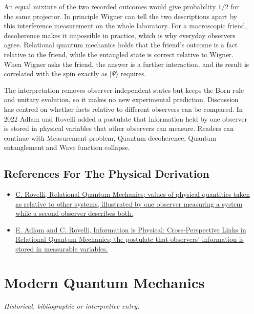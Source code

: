 \documentclass[11pt,oneside]{book}
\newcommand{\ket}[1]{\lvert #1\rangle}
\begin{document}
An equal mixture of the two recorded outcomes would give probability \(1/2\) for the same projector. In principle Wigner can tell the two descriptions apart by this interference measurement on the whole laboratory. For a macroscopic friend, decoherence makes it impossible in practice, which is why everyday observers agree. Relational quantum mechanics holds that the friend's outcome is a fact relative to the friend, while the entangled state is correct relative to Wigner. When Wigner asks the friend, the answer is a further interaction, and its result is correlated with the spin exactly as \(\ket{\Psi}\) requires.

The interpretation removes observer-independent states but keeps the Born rule and unitary evolution, so it makes no new experimental prediction. Discussion has centred on whether facts relative to different observers can be compared. In 2022 Adlam and Rovelli added a postulate that information held by one observer is stored in physical variables that other observers can measure. Readers can continue with Measurement problem, Quantum decoherence, Quantum entanglement and Wave function collapse.

\subsection*{References For The Physical Derivation}
\begin{itemize}
\item \href{https://arxiv.org/abs/quant-ph/9609002}{C. Rovelli, Relational Quantum Mechanics; values of physical quantities taken as relative to other systems, illustrated by one observer measuring a system while a second observer describes both.}
\item \href{https://arxiv.org/abs/2203.13342}{E. Adlam and C. Rovelli, Information is Physical: Cross-Perspective Links in Relational Quantum Mechanics; the postulate that observers' information is stored in measurable variables.}
\end{itemize}





\clearpage

\section{Modern Quantum Mechanics}

\label{topic:modern-quantum-mechanics}

\par\smallskip\noindent\textit{Historical, bibliographic or interpretive entry.}
\end{document}
